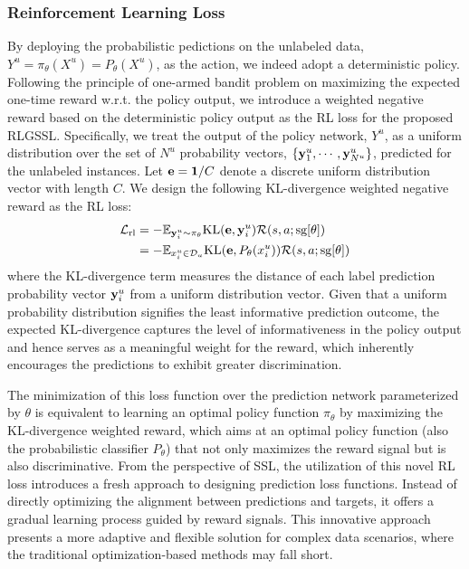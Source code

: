 \subsubsection{Reinforcement Learning Loss}

By deploying the probabilistic pedictions on the unlabeled data, 
$Y^u= \pi_\theta(X^u)=P_\theta(X^u)$, 
as the action, we indeed adopt a deterministic policy. 
Following the principle of one-armed bandit problem on 
maximizing the expected one-time reward w.r.t. the policy output, 
we introduce a weighted negative reward based on the deterministic policy output
as the RL loss for the proposed RLGSSL.
Specifically, we treat the output of the policy network, $Y^u$, 
as a uniform distribution over the set of $N^u$ probability vectors, 
$\{{\bf y}_1^u,\cdots, {\bf y}_{N^u}^u\}$,
predicted for the unlabeled instances.
Let ${\bf e}={\bf 1}/C$ denote a discrete uniform distribution vector with length $C$. 
We design the following KL-divergence weighted negative reward as the RL loss:
\begin{equation}
\begin{aligned}
\label{eqa:rl_loss-kl}
\mathcal{L}_{\text{rl}} 
&= - \mathbb{E}_{{\bf y}_i^u\sim\pi_\theta} \mbox{KL}({\bf e}, {\bf y}_i^u)\mathcal{R}(s,a;\text{sg}[\theta])\\ 
&= - \mathbb{E}_{x_i^u\in \mathcal{D}_u} \mbox{KL}({\bf e}, P_\theta(x_i^u))\mathcal{R}(s,a;\text{sg}[\theta])\\ 
\end{aligned}
\end{equation}
where the KL-divergence term measures the distance of each label prediction probability vector
${\bf y}_i^u$ from a uniform distribution vector.
Given that a uniform probability distribution signifies the least informative prediction outcome, 
the expected KL-divergence captures the level of informativeness in the policy output
and hence serves as a meaningful weight for the reward, 
which inherently encourages the predictions to exhibit greater discrimination.


The minimization of this loss function over the prediction network parameterized by $\theta$ 
is equivalent to learning an optimal policy function $\pi_\theta$ by maximizing 
the KL-divergence weighted reward,
which aims at an optimal policy function (also the probabilistic classifier $P_\theta$) 
that not only maximizes the reward signal but is also discriminative.
From the perspective of SSL, the utilization of this novel RL loss introduces a fresh approach 
to designing prediction loss functions. 
Instead of directly optimizing the alignment between predictions and targets, 
it offers a gradual learning process guided by reward signals. 
This innovative approach presents a more 
adaptive and flexible 
solution for complex data scenarios,
where the traditional optimization-based methods may fall short.


